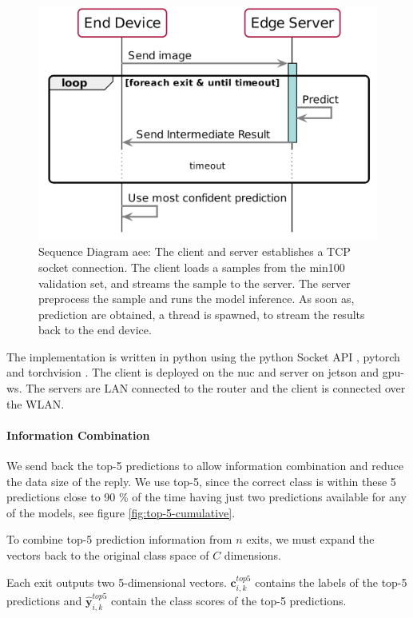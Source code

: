 \begin{figure}
	\captionsetup[subfigure]{justification=centering}
	\centering
	\includegraphics[width=.7\linewidth]{figures/models/sequence_diagram}
	\caption[Sequence Diagram \acrshort{aee}]{Sequence Diagram \acrshort{aee}: The client and server establishes a TCP socket connection. The client loads a samples from the \gls{min100} validation set, and streams the sample to the server. The server preprocess the sample and runs the model inference. As soon as, prediction are obtained, a thread is spawned, to stream the results back to the end device. }
	\label{fig:sequence-diagram}
\end{figure}

The implementation is written in \gls{python} using the \gls{python} Socket API \cite{noauthor_socket_nodate}, \gls{pytorch} \cite{paszke_automatic_2017} and \gls{torchvision} \cite{marcel_torchvision_2010}. The client is deployed on the \gls{nuc} and server on \gls{jetson} and \gls{gpu-ws}. The servers are LAN connected to the router and the client is connected over the WLAN.

\paragraph{Information Combination}

We send back the top-5 predictions to allow information combination and reduce the data size of the reply. We use top-5, since the correct class is within these 5 predictions close to 90 \% of the time having just two predictions available for any of the models, see figure \ref{fig:top-5-cumulative}.

To combine top-5 prediction information from $ n $ exits, we must expand the vectors back to the original class space of $ C $ dimensions.

Each exit outputs two 5-dimensional vectors. $\bm{c}_{i,k}^{top5}$ contains the labels of the top-5 predictions and $ \bm{\hat{y}}_{i,k}^{top5}$ contain the class scores of the top-5 predictions. 

